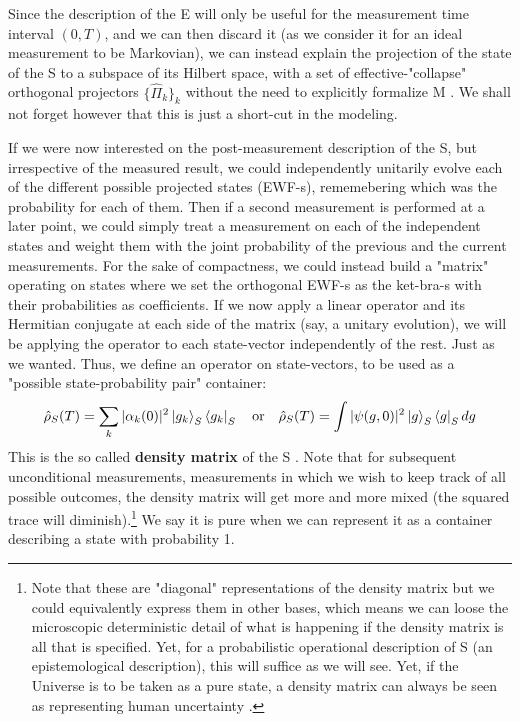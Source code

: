 \documentclass[11pt, a4paper]{article} %
\begin{document}
Since the description of the E will only be useful for the measurement time interval $(0,T)$, and we can then discard it (as we consider it for an ideal measurement to be Markovian), we can instead explain the projection of the state of the S to a subspace of its Hilbert space, with a set of effective-"collapse" orthogonal projectors $\{\hat{\Pi}_k\}_k$ without the need to explicitly formalize M \cite{Durr}. We shall not forget however that this is just a short-cut in the modeling.

If we were now interested on the post-measurement description of the S, but irrespective of the measured result, we could independently unitarily evolve each of the different possible projected states (EWF-s), rememebering which was the probability for each of them. Then if a second measurement is performed at a later point, we could simply treat a measurement on each of the independent states and weight them with the joint probability of the previous and the current measurements. For the sake of compactness, we could instead build a "matrix" operating on states where we set the orthogonal EWF-s as the ket-bra-s with their probabilities as coefficients. If we now apply a linear operator and its Hermitian conjugate at each side of the matrix (say, a unitary evolution), we will be applying the operator to each state-vector independently of the rest. Just as we wanted. Thus, we define an operator on state-vectors, to be used as a "possible state-probability pair" container:
\begin{equation}\label{dens}
\hat{\rho}_S(T) =\sum_k |\alpha_k(0)|^2\ket{g_k}_S\bra{g_k}_S \quad \text{or} \quad \hat{\rho}_S(T)=\int |\psi(g,0)|^2\ket{g}_S\bra{g}_S dg
\end{equation}
This is the so called {\bf density matrix} of the S \cite{vonNeumann, Durr, Holland}. Note that for subsequent unconditional measurements, measurements in which we wish to keep track of all possible outcomes, the density matrix will get more and more mixed (the squared trace will diminish).\footnote{Note that these are "diagonal" representations of the density matrix but we could equivalently express them in other bases, which means we can loose the microscopic deterministic detail of what is happening if the density matrix is all that is specified. Yet, for a probabilistic operational description of S (an epistemological description), this will suffice as we will see. Yet, if the Universe is to be taken as a pure state, a density matrix can always be seen as representing human uncertainty \cite{Generalized}.} We say it is pure when we can represent it as a container describing a state with probability 1. 
\end{document}
